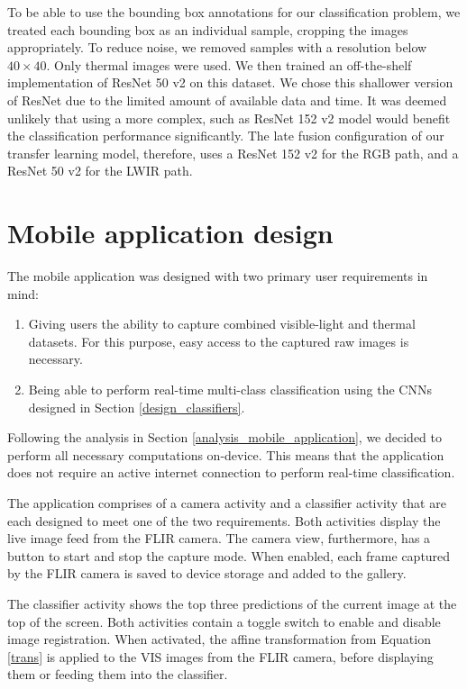 \documentclass{l4proj}
\begin{document}
To be able to use the bounding box annotations for our classification problem, we treated each bounding box as an individual sample, cropping the images appropriately. To reduce noise, we removed samples with a resolution below $40 \times 40$. Only thermal images were used. We then trained an off-the-shelf implementation of ResNet 50 v2 on this dataset. We chose this shallower version of ResNet due to the limited amount of available data and time. It was deemed unlikely that using a more complex, such as ResNet 152 v2 model would benefit the classification performance significantly. The late fusion configuration of our transfer learning model, therefore, uses a ResNet 152 v2 for the RGB path, and a ResNet 50 v2 for the LWIR path.


\section{Mobile application design}
\label{design_mobile_app}

The mobile application was designed with two primary user requirements in mind:

\begin{enumerate}
  \item Giving users the ability to capture combined visible-light and thermal datasets. For this purpose, easy access to the captured raw images is necessary.
  \item Being able to perform real-time multi-class classification using the CNNs designed in Section \ref{design_classifiers}.
\end{enumerate}

Following the analysis in Section \ref{analysis_mobile_application}, we decided to perform all necessary computations on-device. This means that the application does not require an active internet connection to perform real-time classification. 

The application comprises of a camera activity and a classifier activity that are each designed to meet one of the two requirements. Both activities display the live image feed from the FLIR camera. The camera view, furthermore, has a button to start and stop the capture mode. When enabled, each frame captured by the FLIR camera is saved to device storage and added to the gallery.

The classifier activity shows the top three predictions of the current image at the top of the screen. Both activities contain a toggle switch to enable and disable image registration. When activated, the affine transformation from Equation \ref{trans} is applied to the VIS images from the FLIR camera, before displaying them or feeding them into the classifier.
\end{document}
